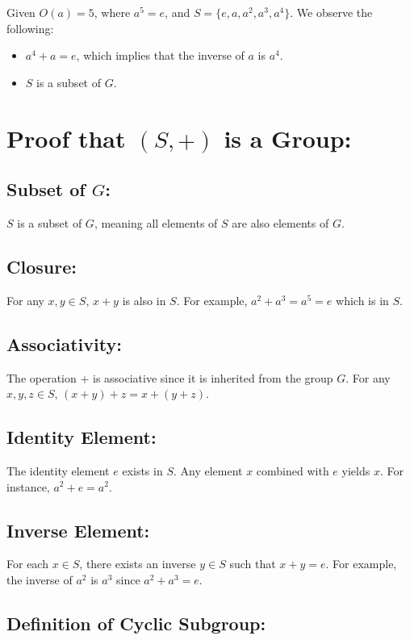 \documentclass[11pt]{article}
\begin{document}
Given $O(a) = 5$, where $a^5 = e$, and $S = \{e, a, a^2, a^3, a^4\}$.
We observe the following:
\begin{itemize}
    \item $a^4 + a = e$, which implies that the inverse of $a$ is $a^4$.
    \item $S$ is a subset of $G$.
\end{itemize}

\section{Proof that $(S, +)$ is a Group:}

\subsection{Subset of $G$:}

$S$ is a subset of $G$, meaning all elements of $S$ are also elements of $G$.

\subsection{Closure:}

For any $x, y \in S$, $x + y$ is also in $S$. For example, $a^2 + a^3 = a^5 = e$ which is in $S$.

\subsection{Associativity:}

The operation $+$ is associative since it is inherited from the group $G$. For any $x, y, z \in S$, $(x + y) + z = x + (y + z)$.

\subsection{Identity Element:}

The identity element $e$ exists in $S$. Any element $x$ combined with $e$ yields $x$. For instance, $a^2 + e = a^2$.

\subsection{Inverse Element:}

For each $x \in S$, there exists an inverse $y \in S$ such that $x + y = e$. For example, the inverse of $a^2$ is $a^3$ since $a^2 + a^3 = e$.

\subsection{Definition of Cyclic Subgroup:}
\end{document}
